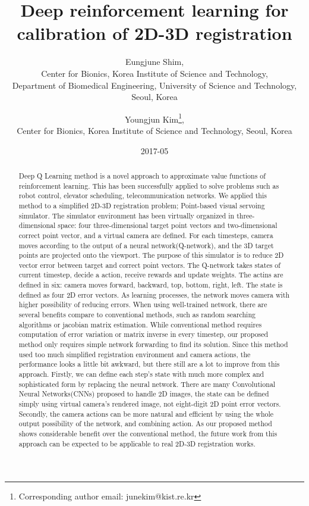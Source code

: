 \documentclass[10pt]{article}
\begin{document}
\title{Deep reinforcement learning for calibration of 2D-3D registration}

\author{Eungjune Shim, \\
Center for Bionics, Korea Institute of Science and Technology, \\
Department of Biomedical Engineering, University of Science and Technology, Seoul, Korea
\and Youngjun Kim\thanks{Corresponding author email: junekim@kist.re.kr},
\\ Center for Bionics, Korea Institute of Science and Technology, Seoul, Korea}

\date{2017-05}
\maketitle

\begin{abstract}
 Deep Q Learning method is a novel approach to approximate value functions of reinforcement learning. This has been successfully applied to solve problems such as robot control, elevator scheduling, telecommunication networks. We applied this method to a simplified 2D-3D registration problem; Point-based visual servoing simulator. The simulator environment has been virtually organized in three-dimensional space: four three-dimensional target point vectors and two-dimensional correct point vector, and a virtual camera are defined. For each timesteps, camera moves according to the output of a neural network(Q-network), and the 3D target points are projected onto the viewport. The purpose of this simulator is to reduce 2D vector error between target and correct point vectors. The Q-network takes states of current timestep, decide a action, receive rewards and update weights. The actins are defined in six: camera moves forward, backward, top, bottom, right, left. The state is defined as four 2D error vectors. As learning processes, the network moves camera with higher possibility of reducing errors. When using well-trained network, there are several benefits compare to conventional methods, such as random searching algorithms or jacobian matrix estimation. While conventional method requires computation of error variation or matrix inverse in every timestep, our proposed method only requires simple network forwarding to find its solution. Since this method used too much simplified registration environment and camera actions, the performance looks a little bit awkward, but there still are a lot to improve from this approach. Firstly, we can define each step's state with much more complex and sophisticated form by replacing the neural network. There are many Convolutional Neural Networks(CNNs) proposed to handle 2D images, the state can be defined simply using virtual camera's rendered image, not eight-digit 2D point error vectors. Secondly, the camera actions can be more natural and efficient by using the whole output possibility of the network, and combining action. As our proposed method shows considerable benefit over the conventional method, the future work from this approach can be expected to be applicable to real 2D-3D registration works.


\end{abstract}
\end{document}
